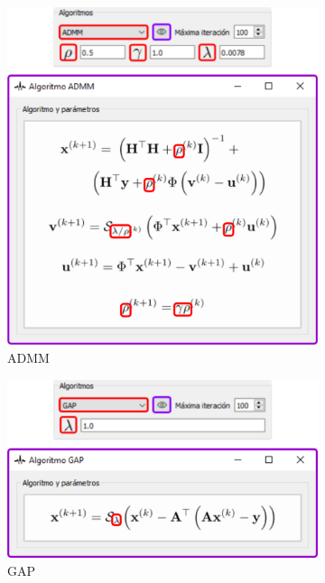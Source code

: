 \documentclass[12pt,twoside,letter]{ol-softwaremanual}
\begin{document}
\begin{figure}[!ht]
\begin{subfigure}[b]{0.47\textwidth}
         \includegraphics[width=\textwidth]{algorithm-admm.png}
         \caption{ADMM}
         \label{fig:admm}
     \end{subfigure}
     \begin{subfigure}[b]{0.47\textwidth}
         \centering
         \includegraphics[width=\textwidth]{algorithm-gap.png}
         \caption{GAP}
         \label{fig:gap}
     \end{subfigure}
     \hfill
     \begin{subfigure}[b]{0.47\textwidth}
         \centering

\end{subfigure}
\end{figure}
\end{document}
